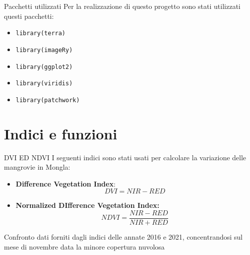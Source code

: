 \documentclass{beamer} %
\begin{document}
        \begin{frame}{Pacchetti utilizzati}
Per la realizzazione di questo progetto sono stati utilizzati questi pacchetti: 
\bigskip
\begin{itemize}
    \item    \texttt{library(terra)} 
    \item    \texttt{library(imageRy)} 
    \item    \texttt{library(ggplot2)} 
    \item    \texttt{library(viridis)}
    \item    \texttt{library(patchwork)}
    \end{itemize}
        \end{frame}

\section{Indici e funzioni}
        \begin{frame}{DVI ED NDVI}
    I seguenti indici sono stati usati per calcolare la variazione delle mangrovie in Mongla:
    \begin{itemize} 
    \item \textbf{Difference Vegetation Index}:\begin{equation}
DVI={NIR-RED}
    \end{equation}
    \item \textbf{Normalized DIfference Vegetation Index:} \begin{equation}
NDVI=\frac{NIR-RED}{NIR+RED}
    \end{equation}
\end{itemize}
\bigskip
\bigskip
Confronto dati forniti dagli indici delle annate 2016 e 2021, concentrandosi sul mese di novembre data la minore copertura nuvolosa
        \end{frame}
        
\end{document}
